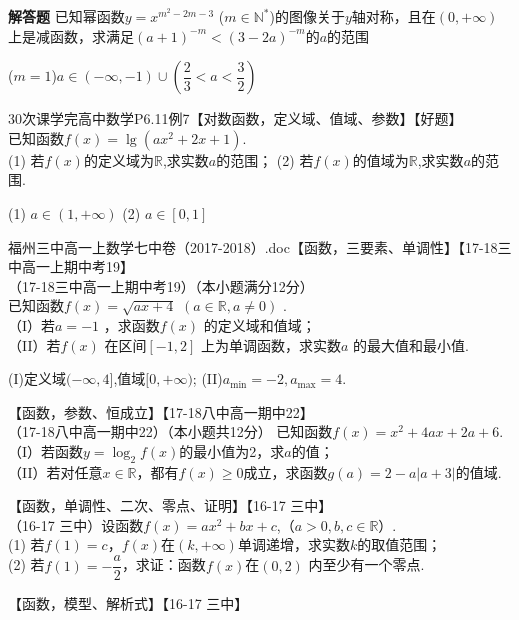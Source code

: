 \begin{exercise}{\bf 解答题}
      已知幂函数$y=x^{m^2-2m-3} $ ($m\in \mathbb{N}^* $)的图像关于$y$轴对称，且在$(0,+\infty) $上是减函数，求满足$(a+1)^{-m}<(3-2a)^{-m} $的$a$的范围
      \begin{answer}
        ($m=1$)$a\in (-\infty,-1)\cup(\dfrac23<a<\dfrac32)$
      \end{answer}
    \item 30次课学完高中数学P6.11例7【对数函数，定义域、值域、参数】【好题】\\
      已知函数$f(x)=\lg(ax^2+2x+1) $.\\
      (1) 若$f(x)$的定义域为$\mathbb{R}$,求实数$a$的范围；
      (2) 若$f(x)$的值域为$\mathbb{R}$,求实数$a$的范围.
      \begin{answer}
        (1) $a\in(1,+\infty)$
        (2) $a\in[0,1] $
      \end{answer}
    \item 福州三中高一上数学七中卷（2017-2018）.doc【函数，三要素、单调性】【17-18三中高一上期中考19】\\
     （17-18三中高一上期中考19）（本小题满分12分）\\
     已知函数$f(x)=\sqrt{ax+4}$ $(a\in\mathbb{R},a\neq0)$  .\\
     （I）若$a=-1$ ，求函数$f(x)$ 的定义域和值域；\\
     （II）若$f(x)$ 在区间$[-1,2] $ 上为单调函数，求实数$a$ 的最大值和最小值.
     \begin{answer}
      (I)定义域$(-\infty,4]$,值域$[0,+\infty)$;
      (II)$a_{\min}=-2,a_{\max}=4 $.
     \end{answer}
    \item 【函数，参数、恒成立】【17-18八中高一期中22】\\
     （17-18八中高一期中22）（本小题共12分）
     已知函数$f(x)=x^2+4ax+2a+6 $.\\
     （I）若函数$y=\log_2f(x)$的最小值为2，求$a$的值；\\
     （II）若对任意$x\in\mathbb{R}$，都有$f(x)\geq0$成立，求函数$g(a)=2-a|a+3| $的值域.
    \item 【函数，单调性、二次、零点、证明】【16-17 三中】\\
     （16-17 三中）设函数$f(x)=ax^2+bx+c$,（$a>0,b,c\in\mathbb{R}$）.\\
     (1) 若$f(1)=c$，$f(x)$在$(k,+\infty)$单调递增，求实数$k$的取值范围；\\
     (2) 若$f(1)=-\dfrac a2$，求证：函数$f(x)$在$(0,2)$ 内至少有一个零点.
    \item 【函数，模型、解析式】【16-17 三中】\\

\end{exercise}
